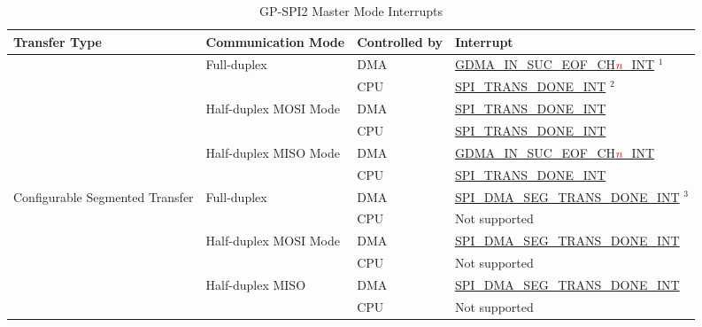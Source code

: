 \documentclass[main\_\_EN.tex]{subfiles}
\begin{document}
\begin{longtable}[c]{|l|l|l|l|}
\caption{GP-SPI2 Master Mode Interrupts}
\\\hline
\rowcolor{lightgray}
\textbf{Transfer Type}  & \textbf{Communication Mode} & \textbf{Controlled by} & \textbf{Interrupt} \\ \hline
\endhead
\label{tab:spi-gp-spi2-master-interrupts}
\multirow{6}{*}{Single Transfer} & \multirow{2}{*}{Full-duplex} & DMA & \hyperref[int:GDMAINSUCEOFINT]{GDMA\_IN\_SUC\_EOF\_CH\textcolor{red}{\it{n}}\_INT} \hyperref[other:spi-item-gp-spi2-master-interrupts-note-1]{$^1$} \\ \cline{3-4}
&& CPU & \hyperref[int:SPITRANSDONEINT]{SPI\_TRANS\_DONE\_INT} \hyperref[other:spi-item-gp-spi2-master-interrupts-note-2]{$^2$}  \\ \cline{2-4}
& \multirow{2}{*}{Half-duplex MOSI Mode} & DMA & \hyperref[int:SPITRANSDONEINT]{SPI\_TRANS\_DONE\_INT} \\ \cline{3-4}
&& CPU & \hyperref[int:SPITRANSDONEINT]{SPI\_TRANS\_DONE\_INT}  \\ \cline{2-4}
& \multirow{2}{*}{Half-duplex MISO Mode} & DMA & \hyperref[int:GDMAINSUCEOFINT]{GDMA\_IN\_SUC\_EOF\_CH\textcolor{red}{\it{n}}\_INT} \\ \cline{3-4}
&& CPU & \hyperref[int:SPITRANSDONEINT]{SPI\_TRANS\_DONE\_INT} \\ \hline
\multirow{6}{*}{Configurable Segmented Transfer} & \multirow{2}{*}{Full-duplex} & DMA & \hyperref[int:SPIDMASEGTRANSDONEINT]{SPI\_DMA\_SEG\_TRANS\_DONE\_INT} \hyperref[other:spi-item-gp-spi2-master-interrupts-note-3]{$^3$} \\ \cline{3-4}
&& CPU & Not supported       \\ \cline{2-4}
& \multirow{2}{*}{Half-duplex MOSI Mode} & DMA  & \hyperref[int:SPIDMASEGTRANSDONEINT]{SPI\_DMA\_SEG\_TRANS\_DONE\_INT} \\ \cline{3-4}
&& CPU           & Not supported       \\ \cline{2-4}
& \multirow{2}{*}{Half-duplex MISO} & DMA & \hyperref[int:SPIDMASEGTRANSDONEINT]{SPI\_DMA\_SEG\_TRANS\_DONE\_INT} \\ \cline{3-4}
&& CPU & Not supported       \\ \hline
\end{longtable}
\vspace{-2em}
\end{document}
